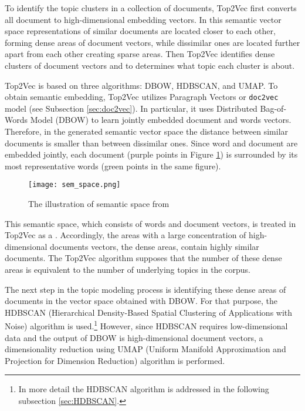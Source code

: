 \documentclass[fontsize=12pt,a4paper,twoside,openany]{scrbook}
\begin{document}
To identify the topic clusters in a collection of documents, Top2Vec first converts all document to high-dimensional embedding vectors. In this semantic vector space representations of similar documents are located closer to each other, forming dense areas of document vectors, while dissimilar ones are located further apart from each other creating sparse areas. Then Top2Vec identifies dense clusters of document vectors and to determines what topic each cluster is about.

Top2Vec is based on three algorithms: DBOW, HDBSCAN, and UMAP. To obtain semantic embedding, Top2Vec utilizes Paragraph Vectors or \verb|doc2vec| model (see Subsection \ref{sec:doc2vec}). In particular, it uses Distributed Bag-of-Words Model (DBOW) to learn jointly embedded document and words vectors. Therefore, in the generated semantic vector space the distance between similar documents is smaller than between dissimilar ones. Since word and document are embedded jointly, each document (purple points in Figure \ref{fig:sem_space}) is surrounded by its most representative words (green points in the same figure).  

\begin{figure}[h]
\centering
\texttt{[image: sem\_space.png]}
\caption{The illustration of semantic space from \parencite{Angelov20}}
\label{fig:sem_space}
\end{figure}

This semantic space, which consists of words and document vectors, is treated in Top2Vec as a  \parencite[p.~3]{Angelov20}. Accordingly, the areas with a large concentration of high-dimensional documents vectors, the dense areas, contain highly similar documents. The Top2Vec algorithm supposes that the number of these dense areas is equivalent to the number of underlying topics in the corpus. 

The next step in the topic modeling process is identifying these dense areas of documents in the vector space obtained with DBOW. For that purpose, the HDBSCAN (Hierarchical Density-Based Spatial Clustering of Applications with Noise) \parencite{McInnes17b, McInnes17a} algorithm is used.\footnote{In more detail the HDBSCAN algorithm is addressed in the following subsection \ref{sec:HDBSCAN}.} However, since HDBSCAN requires low-dimensional data and the output of DBOW is high-dimensional document vectors, a dimensionality reduction using UMAP (Uniform Manifold Approximation and Projection for Dimension Reduction) algorithm \parencite{McInnes18, McInnes20} is performed.
\end{document}
